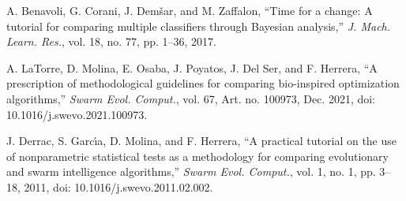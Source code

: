 %

A. Benavoli, G. Corani, J. Dem\v{s}ar, and M. Zaffalon, ``Time for a change: A tutorial for comparing multiple classifiers through Bayesian analysis,'' \textit{J. Mach. Learn. Res.}, vol. 18, no. 77, pp. 1--36, 2017.

A. LaTorre, D. Molina, E. Osaba, J. Poyatos, J. Del Ser, and F. Herrera, ``A prescription of methodological guidelines for comparing bio-inspired optimization algorithms,'' \textit{Swarm Evol. Comput.}, vol. 67, Art. no. 100973, Dec. 2021, doi: 10.1016/j.swevo.2021.100973.

J. Derrac, S. Garc\'{\i}a, D. Molina, and F. Herrera, ``A practical tutorial on the use of nonparametric statistical tests as a methodology for comparing evolutionary and swarm intelligence algorithms,'' \textit{Swarm Evol. Comput.}, vol. 1, no. 1, pp. 3--18, 2011, doi: 10.1016/j.swevo.2011.02.002.

